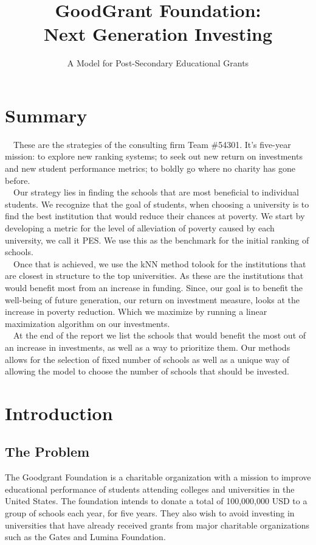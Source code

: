 \documentclass[12pt]{scrartcl}
\title{\vspace{-1.7cm} GoodGrant Foundation: \\Next Generation Investing }
\subtitle{A Model for Post-Secondary Educational Grants\vspace{-1.3cm}}
\begin{document}
\maketitle
\thispagestyle{fancy}

\section*{Summary}
	\ \ These are the strategies of the consulting firm Team \#54301. It's five-year mission: to explore new ranking systems; to seek out new return on investments and new student performance metrics; to boldly go where no charity has gone before.\\
	
	\ \ Our strategy lies in finding the schools that are most beneficial to individual students. We recognize that the goal of students, when choosing a university is to find the best institution that would reduce their chances at poverty. We start by developing a metric for the level of alleviation of poverty caused by each university, we call it PES. We use this as the benchmark for the initial ranking of schools.\\ 

	\ \ Once that is achieved, we use the kNN method tolook for the institutions that are closest in structure to the top universities. As these are the institutions that would benefit most from an increase in funding. Since, our goal is to benefit the well-being of future generation, our return on investment measure, looks at the increase in poverty reduction. Which we maximize by running a linear maximization algorithm on our investments.\\

	\ \ At the end of the report we list the schools that would benefit the most out of an increase in investments, as well as a way to prioritize them. Our methods allows for the selection of fixed number of schools as well as a unique way of allowing the model to choose the number of schools that should be invested. 
\newpage
\tableofcontents
\newpage
	

\section{Introduction}
	\subsection{The Problem}
		The Goodgrant Foundation is a charitable organization with a mission to improve educational performance of students attending colleges and universities in the United States. The foundation intends to donate a total of 100,000,000 USD to a group of schools each year, for five years. They also wish to avoid investing in universities that have already received grants from major charitable organizations such as the Gates and Lumina Foundation.\\
		
\end{document}
